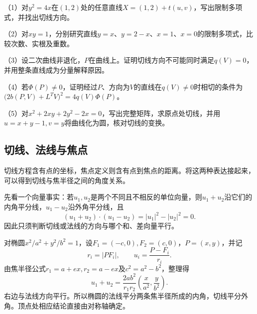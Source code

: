 \begin{exercise}
\mbox{}\par\nobreak
\begin{samepage}
（1）对\(y^2=4x\)在\((1,2)\)处的任意直线\(X=(1,2)+t(u,v)\)，写出限制多项式，并找出切线方向。
\par
\end{samepage}

\begin{samepage}
（2）对\(xy=1\)，分别研究直线\(y=x\)、\(y=2-x\)、\(x=1\)、\(x=0\)的限制多项式，比较次数、实根及重数。
\par
\end{samepage}

\begin{samepage}
（3）设二次曲线非退化，\(P\)在曲线上。证明切线方向不可能同时满足\(q(V)=0\)，并用整条直线成为分量解释原因。
\par
\end{samepage}

\begin{samepage}
（4）若\(\Phi(P)\ne0\)，证明经过\(P\)、方向为\(V\)的直线在\(q(V)\ne0\)时相切的条件为
\(\bigl(2b(P,V)+L^TV\bigr)^2=4q(V)\Phi(P)\)。
\par
\end{samepage}

\begin{samepage}
（5）对\(x^2+2xy+2y^2-2x=0\)，写出完整矩阵，求原点处切线，并用\(u=x+y-1,v=y\)将曲线化为圆，核对切线的变换。
\par
\end{samepage}


\end{exercise}

\newpage
\subsection{切线、法线与焦点}
\label{subsec:quadratic-focal-properties}

切线方程含有点的坐标，焦点定义则含有点到焦点的距离。将这两种表达接起来，可以得到切线与焦半径之间的角度关系。

先看一个向量事实：若\(u_1,u_2\)是两个不同且不相反的单位向量，则\(u_1+u_2\)沿它们的内角平分线，\(u_1-u_2\)沿外角平分线，且
\begin{equation*}
 (u_1+u_2)\cdot(u_1-u_2)=|u_1|^2-|u_2|^2=0.
\end{equation*}
因此只须判断切线或法线的方向与哪个和、差向量平行。

对椭圆\(x^2/a^2+y^2/b^2=1\)，设\(F_1=(-c,0),F_2=(c,0)\)，\(P=(x,y)\)，并记
\begin{equation*}
 r_i=|PF_i|,\qquad u_i=\frac{P-F_i}{r_i}.
\end{equation*}
由焦半径公式\(r_1=a+ex,r_2=a-ex\)及\(c^2=a^2-b^2\)，整理得
\begin{equation*}
 u_1+u_2=\frac{2ab^2}{r_1r_2}
 \left(\frac{x}{a^2},\frac{y}{b^2}\right).
\end{equation*}
右边与法线方向平行。所以椭圆的法线平分两条焦半径所成的内角，切线平分外角。顶点处相应结论直接由对称轴确定。

